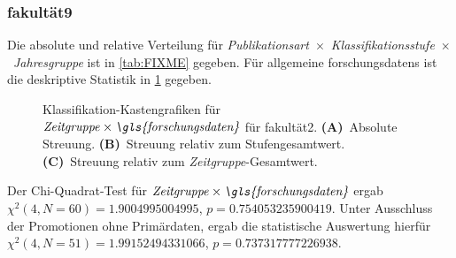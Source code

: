 \subsubsection{\gls{fakultät9}}
Die absolute und relative Verteilung für {\textit{Publikationsart}}~$\times$~{\textit{Klassifikationsstufe}}~$\times$~\textit{Jahresgruppe} ist in \cref{tab:FIXME} gegeben.
Für allgemeine \glspl{forschungsdaten} ist die deskriptive Statistik in \cref{fig:faculty_h_sampled_evaluated_adjusted_factors-only_Zeitgruppe_x_FD_absolute_boxplot} gegeben.
\begin{figure}[!htbp]
    \centering%
    \resizebox{.33\textwidth}{!}{}%
    \resizebox{.33\textwidth}{!}{}%
    \resizebox{.33\textwidth}{!}{}%
    \caption{Klassifikation-Kastengrafiken für $\text{\textit{Zeitgruppe}}\times\text{\textit{\gls{forschungsdaten}}}$ für \gls{fakultät2}. \textbf{(A)}~Absolute Streuung. \textbf{(B)}~Streuung relativ zum Stufengesamtwert. \textbf{(C)}~Streuung relativ zum \textit{Zeitgruppe}-Gesamtwert.}
    \label{fig:faculty_h_sampled_evaluated_adjusted_factors-only_Zeitgruppe_x_FD_absolute_boxplot}
\end{figure}
Der Chi-Quadrat-Test für $\text{\textit{Zeitgruppe}}\times\text{\textit{\gls{forschungsdaten}}}$ ergab $\chi^2 (\num{4}, N = \num{60}) = \num[round-mode=places,round-precision=3]{1.9004995004995}$, $p = \num[round-mode=places,round-precision=3]{0.754053235900419}$.
Unter Ausschluss der Promotionen ohne Primärdaten, ergab die statistische Auswertung hierfür $\chi^2 (\num{4}, N = \num{51}) = \num[round-mode=places,round-precision=3]{1.99152494331066}$, $p = \num[round-mode=places,round-precision=3]{0.737317777226938}$.

